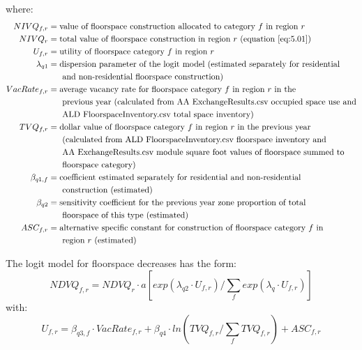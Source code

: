 \noindent where:
\begin{align*}
NIVQ_{f,r} &= \text{value of floorspace construction allocated to category $f$ in region $r$} \\
NIVQ_r &= \text{total value of floorspace construction in region $r$ (equation \ref{eq:5.01})} \\
U_{f,r} &= \text{utility of floorspace category $f$ in region $r$} \\
\lambda_{q1} &= \text{dispersion parameter of the logit model (estimated separately for residential} \\
 &~~~~~\text{and non-residential floorspace construction)} \\
VacRate_{f,r} &= \text{average vacancy rate for floorspace category $f$ in region $r$ in the} \\
 &~~~~~\text{previous year (calculated from AA ExchangeResults.csv occupied space use and} \\
 &~~~~~\text{ALD FloorspaceInventory.csv total space inventory)} \\
TVQ_{f,r} &= \text{dollar value of floorspace category $f$ in region $r$ in the previous year} \\
 &~~~~~\text{(calculated from ALD FloorspaceInventory.csv floorspace inventory and} \\
 &~~~~~\text{AA ExchangeResults.csv module square foot values of floorspace summed to} \\
 &~~~~~\text{floorspace category)} \\
\beta_{q1,f} &= \text{coefficient estimated separately for residential and non-residential} \\
 &~~~~~\text{construction (estimated)} \\
\beta_{q2} &= \text{sensitivity coefficient for the previous year zone proportion of total} \\
 &~~~~~\text{floorspace of this type (estimated)} \\
ASC_{f,r} &= \text{alternative specific constant for construction of floorspace category $f$ in} \\
 &~~~~~\text{region $r$ (estimated)}
\end{align*}

\noindent The logit model for floorspace decreases has the form:
\begin{equation}\label{eq:5.07}   %
NDVQ_{f,r} = NDVQ_r \cdot a \left[ exp({\lambda_{q2}} \cdot U_{f,r}) / \sum_f exp({\lambda_q} \cdot U_{f,r}) \right]
\end{equation}
\noindent with:
\begin{equation}   %
U_{f,r} = {\beta_{q3,f}} \cdot VacRate_{f,r} + \beta_{q4} \cdot ln \left( TVQ_{f,r} / \sum_f TVQ_{f,r} \right) + ASC_{f,r}
\end{equation}

